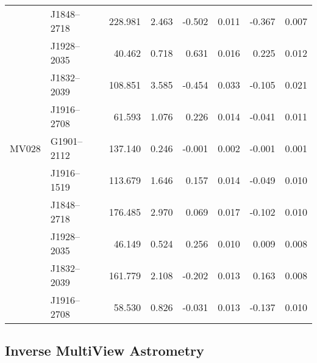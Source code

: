 \begin{table}[h]
\begin{tabular}{llrrrrrr}
	  & J1848--2718  &  228.981  &  2.463  & -0.502  &  0.011  & -0.367  & 0.007  \\
	  & J1928--2035  &   40.462  &  0.718  &  0.631  &  0.016  &  0.225  & 0.012  \\
	  & J1832--2039  &  108.851  &  3.585  & -0.454  &  0.033  & -0.105  & 0.021  \\
	  & J1916--2708  &   61.593  &  1.076  &  0.226  &  0.014  & -0.041  & 0.011  \\ \hline
MV028 & G1901--2112  &  137.140  &  0.246  & -0.001  &  0.002  & -0.001  & 0.001  \\
	  & J1916--1519  &  113.679  &  1.646  &  0.157  &  0.014  & -0.049  & 0.010  \\
	  & J1848--2718  &  176.485  &  2.970  &  0.069  &  0.017  & -0.102  & 0.010  \\
	  & J1928--2035  &   46.149  &  0.524  &  0.256  &  0.010  &  0.009  & 0.008  \\
	  & J1832--2039  &  161.779  &  2.108  & -0.202  &  0.013  &  0.163  & 0.008  \\
	  & J1916--2708  &   58.530  &  0.826  & -0.031  &  0.013  & -0.137  & 0.010  \\ \bottomrule
	\end{tabular}
\end{table}

\clearpage
\subsection{Inverse MultiView Astrometry}   \label{app:imvtables}

